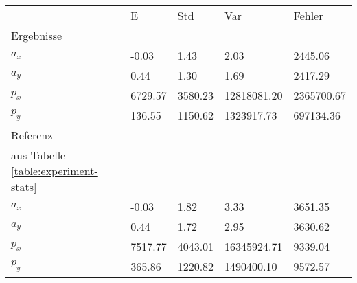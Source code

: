 \begin{tabular}{l|l|l|l|l}

     & E   & Std    & Var    & Fehler \\
\hhline{=|=|=|=|=}

Ergebnisse & & & & \\
$a_x$  &        -0.03 &         1.43 &         2.03 &      2445.06 \\
$a_y$  &         0.44 &         1.30 &         1.69 &      2417.29 \\
$p_x$  &      6729.57 &      3580.23 &  12818081.20 &   2365700.67 \\
$p_y$  &       136.55 &      1150.62 &   1323917.73 &    697134.36 \\

\hline
Referenz & & & & \\
aus Tabelle  \ref{table:experiment-stats} & & & & \\
$a_x$  &        -0.03 &         1.82 &         3.33 &      3651.35 \\
$a_y$  &         0.44 &         1.72 &         2.95 &      3630.62 \\
$p_x$  &      7517.77 &      4043.01 &  16345924.71 &      9339.04 \\
$p_y$  &       365.86 &      1220.82 &   1490400.10 &      9572.57 \\
\end{tabular}
